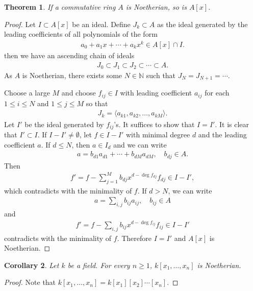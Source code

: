 \documentclass[12pt]{report}
\theoremstyle{plain}
\newtheorem{theorem}{Theorem}[section]
\newtheorem{corollary}[theorem]{Corollary}
\theoremstyle{remark}
\theoremstyle{definition}
\newcommand{\N}{\mathbb{N}}
\begin{document}
\begin{theorem}
    If a commutative ring $A$ is Noetherian, so is $A[x]$.
\end{theorem}
\begin{proof}
    Let $I\subset A[x]$ be an ideal. Define $J_k\subset A$ as the ideal generated by the leading coefficients of all polynomials of the form
    \begin{align*}
        a_0+a_1x+\cdots+a_k x^k \in A[x]\cap I.
    \end{align*}
    then we have an ascending chain of ideals
    \begin{align*}
        J_0\subset J_1\subset J_2\subset\cdots\subset A.
    \end{align*}
    As $A$ is Noetherian, there exists some $N\in\N$ such that $J_N=J_{N+1}=\cdots$.

    Choose a large $M$ and choose $f_{ij}\in I$ with leading coefficient $a_{ij}$ for each $1\le i\le N$ and $1\le j\le M$ so that
    \begin{align*}
        J_k = \langle a_{k1},a_{k2},\dots,a_{kM}\rangle.
    \end{align*}
    Let $I'$ be the ideal generated by $f_{ij}$'s. It suffices to show that $I=I'$. It is clear that $I'\subset I$. If $I-I'\neq\emptyset$, let $f\in I-I'$ with minimal degree $d$ and the leading coefficient $a$. If $d\le N$, then $a\in I_d$ and we can write
    \begin{align*}
        a=b_{d1}a_{d1}+\cdots+b_{dM}a_{dM},\quad b_{dj}\in A.
    \end{align*}
    Then
    \begin{align*}
        f' = f-\sum_{j=1}^M b_{dj}x^{d-\deg f_{dj}}f_{dj}\in I-I',
    \end{align*}
    which contradicts with the minimality of $f$. If $d>N$, we can write
    \begin{align*}
        a = \sum_{i,j} b_{ij}a_{ij},\quad b_{ij}\in A
    \end{align*}
    and
    \begin{align*}
        f'=f-\sum_{i,j}b_{ij}x^{d-\deg f_{ij}}f_{ij}\in I-I'
    \end{align*}
    contradicts with the minimality of $f$. Therefore $I=I'$ and $A[x]$ is Noetherian.
\end{proof}

\begin{corollary}
    Let $k$ be a field. For every $n\ge 1$, $k[x_1,\dots,x_n]$ is Noetherian.
\end{corollary}
\begin{proof}
    Note that $k[x_1,\dots,x_n]=k[x_1][x_2]\cdots[x_n]$.
\end{proof}
\end{document}
